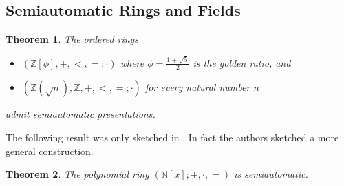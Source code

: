 \documentclass[british,a4paper,]{scrartcl}
\newtheorem{theorem}{Theorem}
\theoremstyle{definition}
\theoremstyle{remark}
\newcommand{\N}{\mathbb{N}}
\newcommand{\Z}{\mathbb{Z}}
\begin{document}
\subsection{Semiautomatic Rings and Fields}
\begin{theorem} \label{sqrtring}
    The ordered rings
    \begin{itemize}
        \item \((\Z[\phi], +, <, =; \cdot)\) where \(\phi = \frac{1+\sqrt{5}}2\) is the golden ratio, and
        \item \((\Z(\sqrt{n}), \Z, +, <, =; \cdot)\) for every natural number \(n\)
    \end{itemize}
    admit semiautomatic presentations.
\end{theorem}

The following result was only sketched in \autocite{semiauto}. In fact the authors sketched a more general construction.
\begin{theorem} \label{thm:semiautonatpoly}
    The polynomial ring \((\N[x]; +, \cdot, =)\) is semiautomatic.
\end{theorem}
\end{document}
